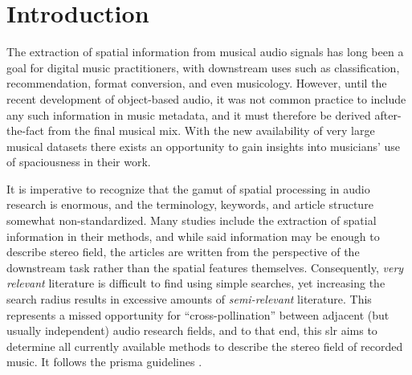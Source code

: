 \documentclass[referee,pdflatex,sn-mathphys-num]{sn-jnl}%
\newcommand{\q}[1]{\enquote{#1}}
\begin{document}



\maketitle

\listoffixmes

\section{Introduction}
\label{sec:intro}
The extraction of spatial information from musical audio signals has long been a goal for digital music practitioners, with downstream uses such as classification, recommendation, format conversion, and even musicology. However, until the recent development of object-based audio, it was not common practice to include any such information in music metadata, and it must therefore be derived after-the-fact from the final musical mix. With the new availability of very large musical datasets there exists an opportunity to gain insights into musicians' use of spaciousness in their work.

It is imperative to recognize that the gamut of spatial processing in audio research is enormous, and the terminology, keywords, and article structure somewhat non-standardized. Many studies include the extraction of spatial information in their methods, and while said information may be enough to describe stereo field, the articles are written from the perspective of the downstream task rather than the spatial features themselves. Consequently, \textit{very relevant} literature is difficult to find using simple searches, yet increasing the search radius results in excessive amounts of \textit{semi-relevant} literature. This represents a missed opportunity for \q{cross-pollination} between adjacent (but usually independent) audio research fields, and to that end, this \gls{slr} aims to determine all currently available methods to describe the stereo field of recorded music. It follows the \gls{prisma} guidelines \cite{pagePRISMA2020Statement2021}.
\end{document}
